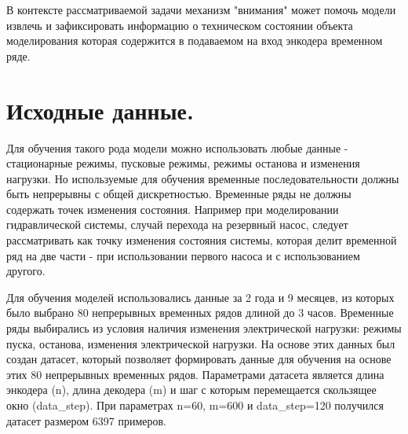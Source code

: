 \documentclass[12pt,a4paper]{article}
\begin{document}
В контексте рассматриваемой задачи механизм "внимания" может помочь модели извлечь и зафиксировать информацию о техническом состоянии объекта моделирования которая содержится в подаваемом на вход энкодера временном ряде.






\section{Исходные данные.}
Для обучения такого рода модели можно использовать любые данные - стационарные режимы, пусковые режимы, режимы останова и изменения нагрузки. Но используемые для обучения временные последовательности должны быть непрерывны с общей дискретностью. Временные ряды не должны содержать точек изменения состояния. Например при моделировании гидравлической системы, случай перехода на резервный насос, следует рассматривать как точку изменения состояния системы, которая делит временной ряд на две части - при использовании первого насоса и с использованием другого.

Для обучения моделей использовались данные за 2 года и 9 месяцев, из которых было выбрано 80 непрерывных временных рядов длиной до 3 часов. Временные ряды выбирались из условия наличия изменения электрической нагрузки: режимы пуска, останова, изменения электрической нагрузки. На основе этих данных был создан датасет, который позволяет формировать данные для обучения на основе этих 80 непрерывных временных рядов. Параметрами датасета является длина энкодера (n), длина декодера (m) и шаг с которым перемещается скользящее окно (data\_step). При параметрах n=60, m=600 и data\_step=120 получился датасет размером 6397 примеров. 
\end{document}
